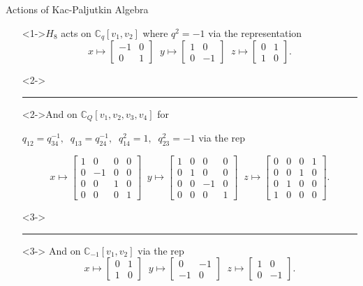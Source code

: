 \documentclass{beamer}
\newcommand\1{_{(1)}}
\newcommand\2{_{(2)}}
\begin{document}
\begin{frame}{Actions of Kac-Paljutkin Algebra}

\begin{itemize}

    \item[]<1->$H_8$ acts on $\mathbb{C}_q[v_1,v_2]$ where $q^2=-1$ via the representation
    \[
    x\mapsto \begin{bmatrix}-1 & 0\\0 & 1\end{bmatrix} \;\; y\mapsto \begin{bmatrix} 1 & 0\\ 0 & -1\end{bmatrix} \;\; z\mapsto\begin{bmatrix} 0 & 1\\ 1 & 0\end{bmatrix}.
    \]
    \item[]<2-> \hrule
    \item[]<2->And on $\mathbb{C}_Q[v_1,v_2,v_3,v_4]$ for 
   
    \vspace{1ex}
    $q_{12}=q_{34}^{-1},\;\;q_{13}=q_{24}^{-1},\;\;q_{14}^2=1,\;\;q_{23}^2=-1$ via the rep
    
    \[
    x\mapsto \begin{bmatrix} 1&0&0&0\\0&-1&0&0\\0&0&1&0\\0&0&0&1\end{bmatrix} \;\; y\mapsto \begin{bmatrix} 1&0&0&0\\0&1&0&0\\0&0&-1&0\\0&0&0&1\end{bmatrix}\;\; z\mapsto\begin{bmatrix}0&0&0&1\\0&0&1&0\\0&1&0&0\\1&0&0&0\end{bmatrix}.
    \]
    
    \item[]<3->\hrule
    \item[]<3-> And on $\mathbb{C}_{-1}[v_1,v_2]$ via the rep
    \[
    x\mapsto \begin{bmatrix}0&1\\1&0\end{bmatrix}\;\; y\mapsto\begin{bmatrix}0&-1\\-1&0\end{bmatrix}\;\; z\mapsto\begin{bmatrix}1&0\\0&-1\end{bmatrix}.
    \]
\end{itemize}
\end{frame}
\end{document}
